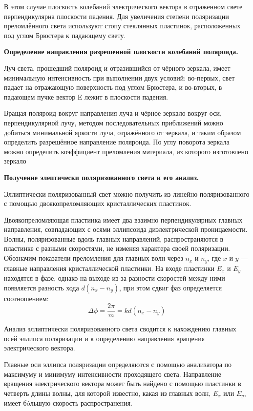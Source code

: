 \documentclass[a4paper,12pt]{report}
\begin{document}
В этом случае плоскость колебаний электрического вектора в отраженном свете перпендикулярна плоскости падения. Для увеличения степени поляризации преломлённого света используют стопу стеклянных пластинок, расположенных под углом Брюстера к падающему свету. \par

\textbf{Определение направления разрешенной плоскости колебаний поляроида.}\par
Луч света, прошедший поляроид и отразившийся от чёрного зеркала, имеет минимальную интенсивность при выполнении двух условий: во-первых, свет падает на отражающую поверхность под углом Брюстера, и во-вторых, в падающем пучке вектор E лежит в плоскости падения. \par
Вращая поляроид вокруг направления луча и чёрное зеркало вокруг оси, перпендикулярной лучу, методом последовательных приближений можно добиться минимальной яркости луча, отражённого от зеркала, и таким образом определить разрешённое направление поляроида. По углу поворота зеркала можно определить коэффициент преломления материала, из которого изготовлено зеркало \par

\textbf{Получение элептически поляризованного света и его анализ.}\par
Эллиптически поляризованный свет можно получить из линейно поляризованного с
помощью двоякопреломляющих кристаллических пластинок.

Двоякопреломляющая пластинка имеет два взаимно перпендикулярных главных направления, совпадающих с осями эллипсоида диэлектрической проницаемости. Волны, поляризованные вдоль главных направлений, распространяются в пластинке с разными скоростями, не изменяя характера своей поляризации. Обозначим показатели преломления для главных волн через $ n_x $ и $ n_y $, где $ x $ и $ y $ --- главные направления кристаллической пластинки. На входе пластинки $ E_x $ и $ E_y $ находятся в фазе, однако на выходе из-за разности скоростей между ними появляется разность хода $ d(n_x - n_y) $, при этом сдвиг фаз определяется соотношением:
\begin{equation}\label{}
    \Delta \phi =  \dfrac{2\pi}{m} = k d(n_x - n_y)
\end{equation}

Анализ эллиптически поляризованного света сводится к нахождению главных осей
эллипса поляризации и к определению направления вращения электрического вектора.

Главные оси эллипса поляризации определяются с помощью анализатора по максимуму и минимуму интенсивности проходящего света. Направление вращения электрического вектора может быть найдено с помощью пластинки в четверть длины волны, для которой известно, какая из главных волн, $ E_x $ или $ E_y $, имеет б\'{o}льшую скорость распространения.
\end{document}
